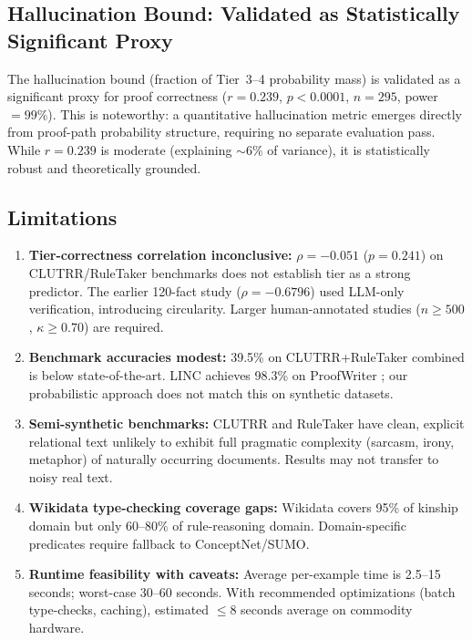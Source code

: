 \documentclass[11pt,letterpaper]{article}
\begin{document}
\subsection{Hallucination Bound: Validated as Statistically Significant Proxy}

The hallucination bound (fraction of Tier~3--4 probability mass) is validated as a significant proxy for proof correctness ($r=0.239$, $p<0.0001$, $n=295$, power$=99\%$). This is noteworthy: a quantitative hallucination metric emerges directly from proof-path probability structure, requiring no separate evaluation pass. While $r=0.239$ is moderate (explaining $\sim$6\% of variance), it is statistically robust and theoretically grounded.

\subsection{Limitations}

\begin{enumerate}
  \item \textbf{Tier-correctness correlation inconclusive:} $\rho=-0.051$ ($p=0.241$) on CLUTRR/RuleTaker benchmarks does not establish tier as a strong predictor. The earlier 120-fact study ($\rho=-0.6796$) used LLM-only verification, introducing circularity. Larger human-annotated studies ($n\geq500$, $\kappa\geq0.70$) are required.
  \item \textbf{Benchmark accuracies modest:} 39.5\% on CLUTRR+RuleTaker combined is below state-of-the-art. LINC achieves 98.3\% on ProofWriter \citep{Olausson2023}; our probabilistic approach does not match this on synthetic datasets.
  \item \textbf{Semi-synthetic benchmarks:} CLUTRR and RuleTaker have clean, explicit relational text unlikely to exhibit full pragmatic complexity (sarcasm, irony, metaphor) of naturally occurring documents. Results may not transfer to noisy real text.
  \item \textbf{Wikidata type-checking coverage gaps:} Wikidata covers 95\% of kinship domain but only 60--80\% of rule-reasoning domain. Domain-specific predicates require fallback to ConceptNet/SUMO.
  \item \textbf{Runtime feasibility with caveats:} Average per-example time is 2.5--15 seconds; worst-case 30--60 seconds. With recommended optimizations (batch type-checks, caching), estimated $\leq$8 seconds average on commodity hardware.
\end{enumerate}
\end{document}
